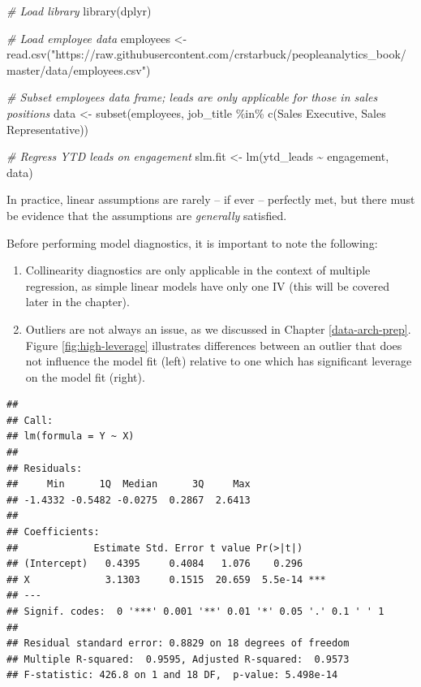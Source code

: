\documentclass[
]{book}
\newenvironment{Shaded}{\begin{snugshade}}{\end{snugshade}}
\newcommand{\CommentTok}[1]{\textcolor[rgb]{0.56,0.35,0.01}{\textit{#1}}}
\newcommand{\FunctionTok}[1]{\textcolor[rgb]{0.00,0.00,0.00}{#1}}
\newcommand{\NormalTok}[1]{#1}
\newcommand{\OtherTok}[1]{\textcolor[rgb]{0.56,0.35,0.01}{#1}}
\newcommand{\SpecialCharTok}[1]{\textcolor[rgb]{0.00,0.00,0.00}{#1}}
\newcommand{\StringTok}[1]{\textcolor[rgb]{0.31,0.60,0.02}{#1}}
\providecommand{\tightlist}{%
  \setlength{\itemsep}{0pt}\setlength{\parskip}{0pt}}
\begin{document}
\begin{Shaded}
\begin{Highlighting}[]
\CommentTok{\# Load library}
\FunctionTok{library}\NormalTok{(dplyr)}

\CommentTok{\# Load employee data}
\NormalTok{employees }\OtherTok{\textless{}{-}} \FunctionTok{read.csv}\NormalTok{(}\StringTok{"https://raw.githubusercontent.com/crstarbuck/peopleanalytics\_book/master/data/employees.csv"}\NormalTok{)}

\CommentTok{\# Subset employees data frame; leads are only applicable for those in sales positions}
\NormalTok{data }\OtherTok{\textless{}{-}} \FunctionTok{subset}\NormalTok{(employees, job\_title }\SpecialCharTok{\%in\%} \FunctionTok{c}\NormalTok{(}\StringTok{\textquotesingle{}Sales Executive\textquotesingle{}}\NormalTok{, }\StringTok{\textquotesingle{}Sales Representative\textquotesingle{}}\NormalTok{))}

\CommentTok{\# Regress YTD leads on engagement}
\NormalTok{slm.fit }\OtherTok{\textless{}{-}} \FunctionTok{lm}\NormalTok{(ytd\_leads }\SpecialCharTok{\textasciitilde{}}\NormalTok{ engagement, data)}
\end{Highlighting}
\end{Shaded}

In practice, linear assumptions are rarely -- if ever -- perfectly met, but there must be evidence that the assumptions are \emph{generally} satisfied.

Before performing model diagnostics, it is important to note the following:

\begin{enumerate}
\def\labelenumi{\arabic{enumi}.}
\tightlist
\item
  Collinearity diagnostics are only applicable in the context of multiple regression, as simple linear models have only one IV (this will be covered later in the chapter).
\item
  Outliers are not always an issue, as we discussed in Chapter \ref{data-arch-prep}. Figure \ref{fig:high-leverage} illustrates differences between an outlier that does not influence the model fit (left) relative to one which has significant leverage on the model fit (right).
\end{enumerate}

\begin{verbatim}
## 
## Call:
## lm(formula = Y ~ X)
## 
## Residuals:
##     Min      1Q  Median      3Q     Max 
## -1.4332 -0.5482 -0.0275  0.2867  2.6413 
## 
## Coefficients:
##             Estimate Std. Error t value Pr(>|t|)    
## (Intercept)   0.4395     0.4084   1.076    0.296    
## X             3.1303     0.1515  20.659  5.5e-14 ***
## ---
## Signif. codes:  0 '***' 0.001 '**' 0.01 '*' 0.05 '.' 0.1 ' ' 1
## 
## Residual standard error: 0.8829 on 18 degrees of freedom
## Multiple R-squared:  0.9595, Adjusted R-squared:  0.9573 
## F-statistic: 426.8 on 1 and 18 DF,  p-value: 5.498e-14
\end{verbatim}
\end{document}
